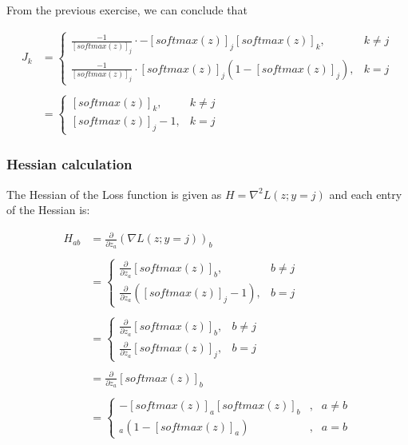 \documentclass[10pt]{article}
\newcommand{\softmax}[1]{ [softmax(z)]_{#1} }
\newcommand{\pz}[1]{ \frac{\partial}{\partial z_{#1}}}
\begin{document}
From the previous exercise, we can conclude that

\begin{equation}
\begin{aligned}
  J_{k} {} & = \left\{
    \begin{array}{ll}
	    \frac{-1}{\softmax{j}} \cdot -[softmax(z)]_{j} [softmax(z)]_{k}, & k \neq j
      \\
	    \frac{-1}{\softmax{j}} \cdot [softmax(z)]_{j} (1 - [softmax(z)]_{j}), & k = j
    \end{array}
  \right.
  \\ \\ &
  = \begin{cases}
	    [softmax(z)]_{k}, & k \neq j
      \\
	    [softmax(z)]_{j} - 1, & k = j
    \end{cases}
\end{aligned}
\end{equation}


\subsubsection{Hessian calculation}

The Hessian of the Loss function is given as $H = \nabla^{2}L(z;y=j)$ and each entry of the Hessian is:

\begin{equation}
\begin{aligned}
  H_{ab} {} & = \pz{a} \left( \nabla L(z;y=j)\right)_{b}
  \\ \\ &
  = \left\{
    \begin{array}{ll}
	    \pz{a}[softmax(z)]_{b}, & b \neq j
      \\
	    \pz{a}\left([softmax(z)]_{j} - 1\right), & b = j
    \end{array}
  \right.
  \\ \\ &
  = \left\{
    \begin{array}{ll}
	    \pz{a}[softmax(z)]_{b}, & b \neq j
      \\
	    \pz{a}[softmax(z)]_{j}, & b = j
    \end{array}
  \right.
  \\ \\ &
  = \pz{a}[softmax(z)]_{b}
  \\ \\ &
  = \left\{\begin{array}{lll}
				-\softmax{a}\softmax{b} & , & a \neq b \\
				\softmax{a}(1 - \softmax{a})& , & a = b
				\end{array}
			\right.
\end{aligned}
\end{equation}
\end{document}
